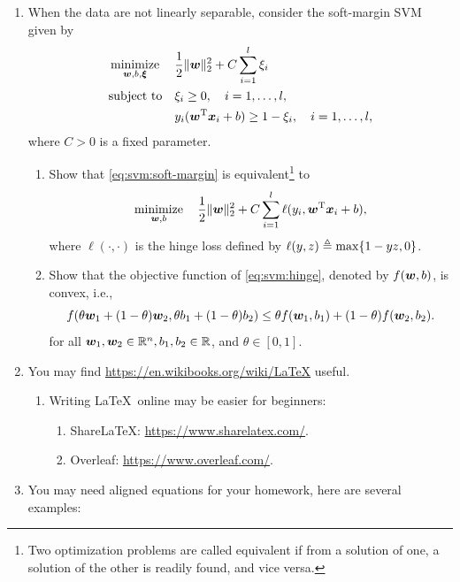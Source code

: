 \documentclass[a4paper]{article}
\begin{document}
\begin{enumerate}
\item When the data are not linearly separable, consider the soft-margin SVM given by
  \begin{equation}
    \begin{aligned}
      &\operatorname*{minimize}_{\bm{w}, b, \bm{\xi}}& &\frac12 \|\bm{w}\|_2^2 + C\sum_{i = 1}^l \xi_i\\
      &\mathrm{subject~to}& & \xi_i \geq 0, \quad i = 1, \dots, l,\\
      && &y_i(\bm{w}^{\mathrm{T}}\bm{x}_i + b) \geq 1 - \xi_i, \quad i = 1, \dots, l,
    \end{aligned}
    \label{eq:svm:soft-margin}
  \end{equation}
  where $C > 0$ is a fixed parameter.
  
  \begin{enumerate}
  \item
    Show that \eqref{eq:svm:soft-margin} is equivalent\footnote{Two optimization problems are called equivalent if from a solution of one, a solution of the other is readily found, and vice versa.} to 
    \begin{equation}
      \operatorname*{minimize}_{\bm{w}, b} \quad\frac12 \|\bm{w}\|_2^2 + C \sum_{i = 1}^l \ell(y_i, \bm{w}^{\mathrm{T}}\bm{x}_i + b),
      \label{eq:svm:hinge}
    \end{equation}
    where $\ell(\cdot, \cdot)$ is the hinge loss defined by $\ell(y, z) \triangleq \max\{1 - yz, 0\}$.

    
  \item
    Show that the objective function of \eqref{eq:svm:hinge}, denoted by $f(\bm{w}, b)$, is convex, i.e.,
    \begin{equation*}
      f(\theta\bm{w}_1 + (1-\theta)\bm{w}_2, \theta b_1 + (1-\theta)b_2) \leq \theta f(\bm{w}_1, b_1)  + (1-\theta)f(\bm{w}_2, b_2).
    \end{equation*}
    for all $\bm{w}_1, \bm{w}_2 \in \mathbb{R}^n, b_1, b_2 \in \mathbb{R}$, and $\theta \in [0, 1]$.
  \end{enumerate}
\item You may find \url{https://en.wikibooks.org/wiki/LaTeX} useful.
  \begin{enumerate}
    \item Writing \LaTeX\ online may be easier for beginners:
        \begin{enumerate}
        \item ShareLaTeX: \url{https://www.sharelatex.com/}.
        \item Overleaf: \url{https://www.overleaf.com/}.
        \end{enumerate}
    \end{enumerate}
  \item You may need aligned equations for your homework, here are several examples:
    

\end{enumerate}
\end{document}
